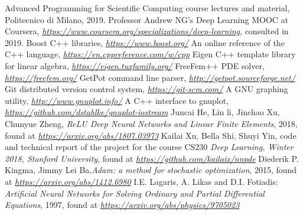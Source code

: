 \documentclass[12pt, a4paper]{report}
\theoremstyle{definition}
\begin{document}


\newpage
\begin{thebibliography}{10}
	
	 Advanced Programming for Scientific Computing course lectures and material, Politecnico di Milano, 2019.
	 Professor Andrew NG's Deep Learning MOOC at Coursera, \href{https://www.coursera.org/specializations/deep-learning}{\emph{https://www.coursera.org/specializations/deep-learning}}, consulted in 2019.
	 Boost C++ libraries, \href{https://www.boost.org/}{\emph{https://www.boost.org/}}
	 An online reference of the C++ language, \href{https://en.cppreference.com/w/cpp}{\emph{https://en.cppreference.com/w/cpp}}
	 Eigen C++ template library for linear algebra, \href{https://eigen.tuxfamily.org/}{\emph{https://eigen.tuxfamily.org/}}
	 FreeFem++ PDE solver, \href{https://freefem.org/}{\emph{https://freefem.org/}}
	 GetPot command line parser, \href{http://getpot.sourceforge.net/}{\emph{http://getpot.sourceforge.net/}}
	 Git distributed version control system, \href{https://git-scm.com/}{\emph{https://git-scm.com/}}
	 A GNU graphing utility, \href{http://www.gnuplot.info/}{\emph{http://www.gnuplot.info/}}
	 A C++ interface to gnuplot, \href{https://github.com/dstahlke/gnuplot-iostream}{\emph{https://github.com/dstahlke/gnuplot-iostream}}
	 Juncai He, Lin li, Jinchao Xu, Chunyue Zheng, \emph{ReLU Deep Neural Networks and Linear Finite Elements}, 2018, found at \href{https://arxiv.org/abs/1807.03973}{\emph{https://arxiv.org/abs/1807.03973}}
	 Kailai Xu, Bella Shi, Shuyi Yin, code and technical report of the project for the course CS230 \emph{Deep Learning, Winter 2018, Stanford University}, found at \href{https://github.com/kailaix/nnpde}{\emph{https://github.com/kailaix/nnpde}}
	 Diederik P. Kingma, Jimmy Lei Ba,\emph{Adam: a method for stochastic optimization}, 2015, found at
	\href{https://arxiv.org/abs/1412.6980}{\emph{https://arxiv.org/abs/1412.6980}} 
	 I.E. Lagaris, A. Likas and D.I. Fotiadis: \emph{Artificial Neural Networks for Solving Ordinary and Partial Differential Equations}, 1997, found at \href{https://arxiv.org/abs/physics/9705023}{\emph{https://arxiv.org/abs/physics/9705023}}

\end{thebibliography}
\end{document}
